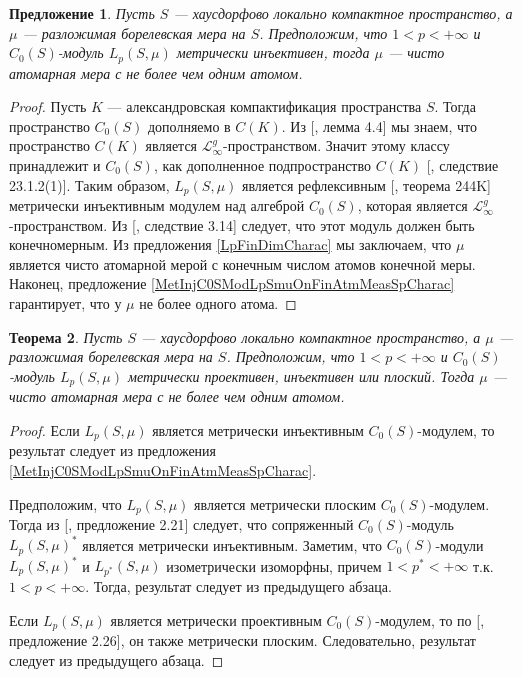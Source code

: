 \documentclass[12pt]{article}
\newtheorem{theorem}{Теорема}[section]
\newtheorem{proposition}[theorem]{Предложение}
\begin{document}
\begin{proposition}\label{MetInjC0SModLpSmuCharac}
    Пусть $S$ --- хаусдорфово локально компактное пространство, а $\mu$ --- 
    разложимая борелевская мера на $S$. Предположим, что $1 < p < +\infty$ 
    и $C_0(S)$-модуль $L_p(S,\mu)$ метрически инъективен, тогда $\mu$ --- чисто 
    атомарная мера с не более чем одним атомом.
\end{proposition}
\begin{proof} 
    Пусть $K$ --- александровская компактификация пространства $S$. 
    Тогда пространство $C_0(S)$ дополняемо в $C(K)$. 
    Из [\cite{DefFloTensNorOpId}, лемма 4.4] мы знаем, что пространство $C(K)$ 
    является $\mathscr{L}_\infty^g$-пространством. Значит этому классу 
    принадлежит и $C_0(S)$, как дополненное подпространство $C(K)$ 
    [\cite{DefFloTensNorOpId}, следствие 23.1.2(1)]. 
    Таким образом, $L_p(S,\mu)$ является рефлексивным 
    [\cite{FremMeasTh2}, теорема 244K] метрически инъективным модулем над 
    алгеброй $C_0(S)$, которая является $\mathscr{L}_\infty^g$-пространством. 
    Из [\cite{NemGeomProjInjFlatBanMod}, следствие 3.14] следует, что этот 
    модуль должен быть конечномерным. Из предложения \ref{LpFinDimCharac} мы 
    заключаем, что $\mu$ является чисто атомарной мерой с конечным числом атомов 
    конечной меры. Наконец, 
    предложение \ref{MetInjC0SModLpSmuOnFinAtmMeasSpCharac} гарантирует, что 
    у $\mu$ не более одного атома.
\end{proof}

\begin{theorem}\label{MetInjPlotjFlatC0SModLpSmuCharac}
    Пусть $S$ --- хаусдорфово локально компактное пространство, а $\mu$ --- 
    разложимая борелевская мера на $S$. Предположим, что $1 < p < +\infty$ 
    и $C_0(S)$-модуль $L_p(S,\mu)$ метрически проективен, инъективен или 
    плоский. Тогда $\mu$ --- чисто атомарная мера с не более чем одним атомом.
\end{theorem}
\begin{proof} 
    Если $L_p(S,\mu)$ является метрически инъективным $C_0(S)$-модулем, то 
    результат следует из 
    предложения \ref{MetInjC0SModLpSmuOnFinAtmMeasSpCharac}. 
    
    Предположим, что $L_p(S,\mu)$ является метрически плоским $C_0(S)$-модулем. 
    Тогда из [\cite{NemGeomProjInjFlatBanMod}, предложение 2.21] следует, что
    сопряженный $C_0(S)$-модуль $L_p(S,\mu)^*$ является метрически инъективным. 
    Заметим, что $C_0(S)$-модули $L_p(S,\mu)^*$ и $L_{p^*}(S,\mu)$ изометрически 
    изоморфны, причем $1 < p^* < +\infty$ т.к. $1 < p < +\infty$. Тогда, 
    результат следует из предыдущего абзаца.
    
    Если $L_p(S,\mu)$ является метрически проективным $C_0(S)$-модулем, то 
    по [\cite{NemGeomProjInjFlatBanMod}, предложение 2.26], он также метрически 
    плоским. Следовательно, результат следует из предыдущего абзаца.
\end{proof}
\end{document}
